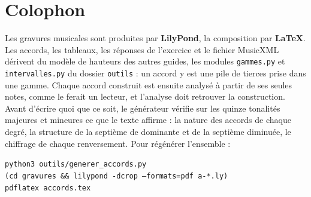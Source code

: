 \documentclass[a4paper,11pt]{article}
\begin{document}
\section*{Colophon}

Les gravures musicales sont produites par \textbf{LilyPond}, la composition
par \textbf{\LaTeX}. Les accords, les tableaux, les réponses de l'exercice et
le fichier MusicXML dérivent du modèle de hauteurs des autres guides, les
modules \texttt{gammes.py} et \texttt{intervalles.py} du dossier
\texttt{outils} : un accord y est une pile de tierces prise dans une gamme.
Chaque accord construit est ensuite analysé à partir de ses seules notes,
comme le ferait un lecteur, et l'analyse doit retrouver la construction.
Avant d'écrire quoi que ce soit, le générateur vérifie sur les quinze
tonalités majeures et mineures ce que le texte affirme : la nature des
accords de chaque degré, la structure de la septième de dominante et de la
septième diminuée, le chiffrage de chaque renversement. Pour régénérer
l'ensemble :

\begin{center}
\texttt{python3 outils/generer\_accords.py}\\
\texttt{(cd gravures \&\& lilypond -dcrop --formats=pdf a-*.ly)}\\
\texttt{pdflatex accords.tex}
\end{center}
\end{document}
